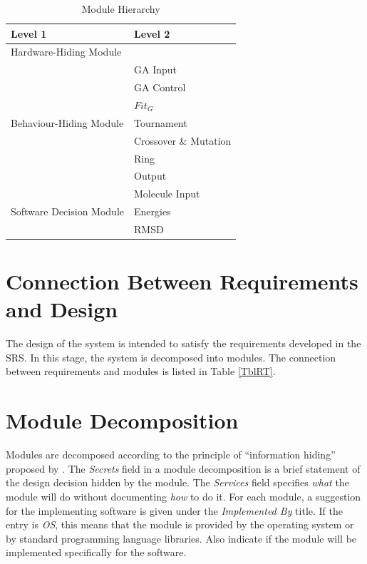 \documentclass[12pt, titlepage]{article}
\begin{document}
\begin{table}[h!]
\centering
\begin{tabular}{p{} p{}}
\toprule
\textbf{Level 1} & \textbf{Level 2}\\
\midrule

{Hardware-Hiding Module} & ~ \\
\midrule

\multirow{7}{0.3\textwidth}{Behaviour-Hiding Module}& GA Input \\
													& GA Control\\
													& $Fit_G$ \\
													& Tournament \\
													& Crossover \& Mutation \\
													& Ring \\
													& Output \\
\midrule

\multirow{3}{0.3\textwidth}{Software Decision Module} & Molecule Input \\
													  & Energies \\
													  & RMSD \\
\bottomrule

\end{tabular}
\caption{Module Hierarchy}
\label{TblMH}
\end{table}

\section{Connection Between Requirements and Design} \label{SecConnection}

The design of the system is intended to satisfy the requirements developed in
the SRS. In this stage, the system is decomposed into modules. The connection
between requirements and modules is listed in Table \ref{TblRT}.

\section{Module Decomposition} \label{SecMD}

Modules are decomposed according to the principle of ``information hiding''
proposed by \citet{ParnasEtAl1984}. The \emph{Secrets} field in a module
decomposition is a brief statement of the design decision hidden by the
module. The \emph{Services} field specifies \emph{what} the module will do
without documenting \emph{how} to do it. For each module, a suggestion for the
implementing software is given under the \emph{Implemented By} title. If the
entry is \emph{OS}, this means that the module is provided by the operating
system or by standard programming language libraries.  Also indicate if the
module will be implemented specifically for the software.
\end{document}
